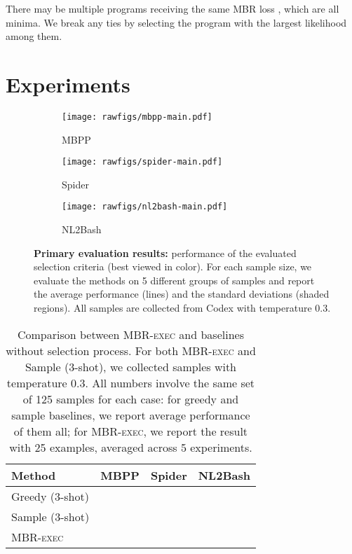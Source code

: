 \documentclass[11pt]{article}
\newcommand{\mbrexec}{\textsc{MBR-exec}\xspace}
\begin{document}
There may be multiple programs receiving the same MBR loss , which are all minima. We break any ties by selecting the program with the largest likelihood among them.

 \section{Experiments}
\label{sec:expr}

\begin{figure*}[t!]
    \centering
    \begin{subfigure}[t]{0.34\textwidth}
        \texttt{[image: rawfigs/mbpp-main.pdf]}
        \caption{MBPP}
    \end{subfigure}
    \hspace{-10pt}
    \begin{subfigure}[t]{0.34\textwidth}
        \texttt{[image: rawfigs/spider-main.pdf]}
        \caption{Spider}
    \end{subfigure}
    \hspace{-10pt}
    \begin{subfigure}[t]{0.34\textwidth}
        \texttt{[image: rawfigs/nl2bash-main.pdf]}
        \caption{NL2Bash}
    \end{subfigure}
    \caption{\textbf{Primary evaluation results:} performance of the evaluated selection criteria (best viewed in color). For each sample size, we evaluate the methods on 5 different groups of samples and report the average performance (lines) and the standard deviations (shaded regions). All samples are collected from Codex with temperature 0.3. }
    \label{fig:main-results}
\end{figure*}


\begin{table}[t]
    \centering \small
    \begin{tabular}{lccc}
        \toprule
        \textbf{Method} & \textbf{MBPP} & \textbf{Spider} & \textbf{NL2Bash} \\
        \midrule
        Greedy (3-shot) &   \hspace{-6pt} &  \hspace{-6pt}   &  \\
        Sample (3-shot) &   \hspace{-6pt} &  \hspace{-6pt}  &   \\
        \midrule 
        \mbrexec &   \hspace{-6pt} &    \hspace{-6pt} &   \\
        \bottomrule
    \end{tabular}
    \caption{Comparison between \mbrexec and baselines without selection process. For both \mbrexec and Sample (3-shot), we collected samples with temperature 0.3. All numbers involve the same set of 125 samples for each case: for greedy and sample baselines, we report average performance of them all; for \mbrexec, we report the result with 25 examples, averaged across 5 experiments. }
    \label{tab:main-results-basic-baseline}
\end{table}
 
\end{document}
